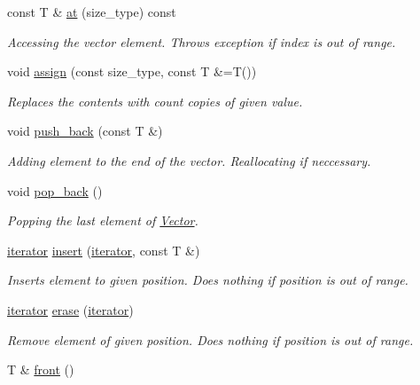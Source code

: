 \begin{DoxyCompactItemize}
const T \& \hyperlink{classtasks_1_1Vector_ad63d3419d6cbd1e2183e1aedbafefa8b}{at} (size\+\_\+type) const 
\begin{DoxyCompactList}\small\item\em Accessing the vector element. Throws exception if index is out of range. \end{DoxyCompactList}\item 
void \hyperlink{classtasks_1_1Vector_a73b42fc6518baa856285c9020e190f06}{assign} (const size\+\_\+type, const T \&=T())
\begin{DoxyCompactList}\small\item\em Replaces the contents with count copies of given value. \end{DoxyCompactList}\item 
void \hyperlink{classtasks_1_1Vector_ab1c1b09b6a799c421187a152a77877c4}{push\+\_\+back} (const T \&)
\begin{DoxyCompactList}\small\item\em Adding element to the end of the vector. Reallocating if neccessary. \end{DoxyCompactList}\item 
void \hyperlink{classtasks_1_1Vector_a847171f065cfda45687356e85db98c8d}{pop\+\_\+back} ()\hypertarget{classtasks_1_1Vector_a847171f065cfda45687356e85db98c8d}{}\label{classtasks_1_1Vector_a847171f065cfda45687356e85db98c8d}

\begin{DoxyCompactList}\small\item\em Popping the last element of \hyperlink{classtasks_1_1Vector}{Vector}. \end{DoxyCompactList}\item 
\hyperlink{classtasks_1_1Vector_1_1Iterator}{iterator} \hyperlink{classtasks_1_1Vector_a5338fcf4fa0597571dddb84cfe22ccd5}{insert} (\hyperlink{classtasks_1_1Vector_1_1Iterator}{iterator}, const T \&)
\begin{DoxyCompactList}\small\item\em Inserts element to given position. Does nothing if position is out of range. \end{DoxyCompactList}\item 
\hyperlink{classtasks_1_1Vector_1_1Iterator}{iterator} \hyperlink{classtasks_1_1Vector_a5ac30d4c2a9f75ae65524089c1c255c1}{erase} (\hyperlink{classtasks_1_1Vector_1_1Iterator}{iterator})
\begin{DoxyCompactList}\small\item\em Remove element of given position. Does nothing if position is out of range. \end{DoxyCompactList}\item 
T \& \hyperlink{classtasks_1_1Vector_aa5ae57b98880a648b6115a2fac977017}{front} ()\hypertarget{classtasks_1_1Vector_aa5ae57b98880a648b6115a2fac977017}{}\label{classtasks_1_1Vector_aa5ae57b98880a648b6115a2fac977017}


\end{DoxyCompactItemize}
